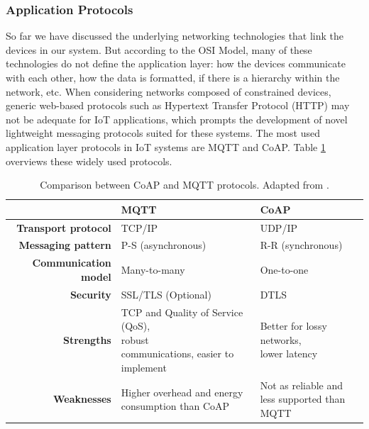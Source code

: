 
\subsubsection{Application Protocols}

So far we have discussed the underlying networking technologies that link the devices in our system. But according to the OSI Model, many of these technologies do not define the application layer: how the devices communicate with each other, how the data is formatted, if there is a hierarchy within the network, etc. When considering networks composed of constrained devices, generic web-based protocols such as Hypertext Transfer Protocol (HTTP) may not be adequate for \acs{IoT} applications, which prompts the development of novel lightweight messaging protocols suited for these systems. The most used application layer protocols in \acs{IoT} systems are \acf{MQTT} and \acf{CoAP}. Table \ref{tab:comparsion-applicationprotocols} overviews these widely used protocols. \bigskip

\renewcommand{\arraystretch}{1.5}
\begin{table}[H]
    \centering
    \begin{tabular}{r|l|l}
        & \textbf{\acs{MQTT}}& \textbf{\acs{CoAP}}  \\ \hline
        \textbf{Transport protocol} & TCP/IP & UDP/IP \\
        \textbf{Messaging pattern} & P-S (asynchronous) & R-R (synchronous) \\
        \textbf{Communication model} & Many-to-many & One-to-one \\
        \textbf{Security} & SSL/TLS (Optional) & DTLS \\
        \textbf{Strengths} & \makecell{TCP and Quality of Service (QoS),\\ robust \\communications, easier to implement } & \makecell{Better for lossy networks,\\ lower latency} \\
        \textbf{Weaknesses} & \makecell{Higher overhead and energy\\ consumption than \acs{CoAP}} & \makecell{Not as reliable and \\less supported than MQTT} \\
    \end{tabular}
    \caption[Comparison between \acs{CoAP} and \acs{MQTT} protocols.]{Comparison between \acs{CoAP} and \acs{MQTT} protocols. Adapted from \cite{10.5555/3161403}.}
    \label{tab:comparsion-applicationprotocols}
\end{table} 
\renewcommand{\arraystretch}{1}

